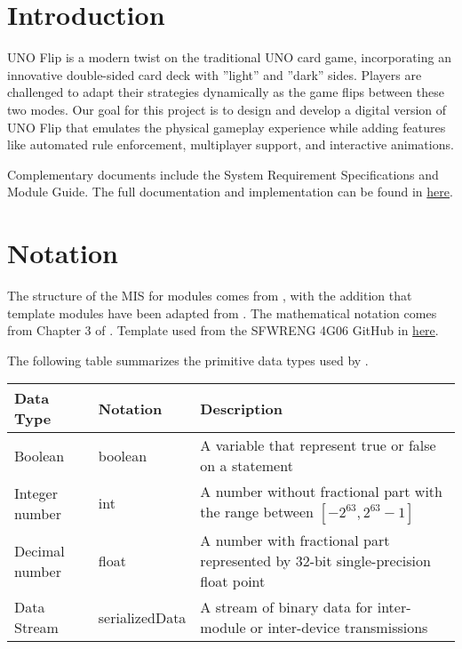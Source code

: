 \documentclass[12pt, titlepage]{article}
\begin{document}
\newpage

\tableofcontents

\newpage


\section{Introduction}

UNO Flip is a modern twist on the traditional UNO card game, incorporating an innovative double-sided card deck with ”light” and ”dark” sides. Players are challenged to adapt their strategies dynamically as the game flips between these two modes. Our goal for this project is to design and develop a digital version of UNO Flip that emulates the physical gameplay experience while adding features like automated rule enforcement, multiplayer support, and interactive animations.

Complementary documents include the System Requirement Specifications and Module Guide. The full documentation and implementation can be found in \href{https://github.com/simon-0215/UNO-Flip-3D/tree/main}{here}. 


\section{Notation}



The structure of the MIS for modules comes from \citet{HoffmanAndStrooper1995},
with the addition that template modules have been adapted from
\cite{GhezziEtAl2003}.  The mathematical notation comes from Chapter 3 of
\citet{HoffmanAndStrooper1995}. Template used from the SFWRENG 4G06 GitHub in \href{https://github.com/smiths/capTemplate/tree/main/docs/Design/SoftDetailedDes}{here}. 

The following table summarizes the primitive data types used by . 

\begin{center}
\renewcommand{\arraystretch}{1.2}
\noindent 
\begin{tabular}{l l p{7.5cm}} 
\toprule 
\textbf{Data Type} & \textbf{Notation} & \textbf{Description}\\ 
\midrule
Boolean & boolean & A variable that represent true or false on a statement \\
Integer number & int & A number without fractional part with the range between $[-2^{63}, 2^{63}-1]$\\
Decimal number & float & A number with fractional part represented by 32-bit single-precision float point\\
Data Stream & serializedData & A stream of binary data for inter-module or inter-device transmissions\\
\bottomrule
\end{tabular} 
\end{center}
\end{document}
